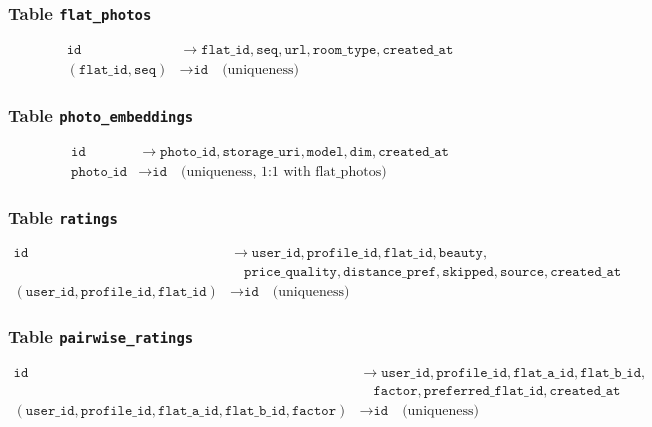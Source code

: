 \documentclass[12pt,a4paper]{article}
\begin{document}
\subsubsection{Table \texttt{flat\_photos}}
\begin{align}
    \texttt{id} &\rightarrow \texttt{flat\_id}, \texttt{seq}, \texttt{url}, \texttt{room\_type}, \texttt{created\_at} \\
    (\texttt{flat\_id}, \texttt{seq}) &\rightarrow \texttt{id} \quad \text{(uniqueness)}
\end{align}

\subsubsection{Table \texttt{photo\_embeddings}}
\begin{align}
    \texttt{id} &\rightarrow \texttt{photo\_id}, \texttt{storage\_uri}, \texttt{model}, \texttt{dim}, \texttt{created\_at} \\
    \texttt{photo\_id} &\rightarrow \texttt{id} \quad \text{(uniqueness, 1:1 with flat\_photos)}
\end{align}

\subsubsection{Table \texttt{ratings}}
\begin{align}
    \texttt{id} &\rightarrow \texttt{user\_id}, \texttt{profile\_id}, \texttt{flat\_id}, \texttt{beauty}, \\
    &\quad \texttt{price\_quality}, \texttt{distance\_pref}, \texttt{skipped}, \texttt{source}, \texttt{created\_at} \\
    (\texttt{user\_id}, \texttt{profile\_id}, \texttt{flat\_id}) &\rightarrow \texttt{id} \quad \text{(uniqueness)}
\end{align}

\subsubsection{Table \texttt{pairwise\_ratings}}
\begin{align}
    \texttt{id} &\rightarrow \texttt{user\_id}, \texttt{profile\_id}, \texttt{flat\_a\_id}, \texttt{flat\_b\_id}, \\
    &\quad \texttt{factor}, \texttt{preferred\_flat\_id}, \texttt{created\_at} \\
    (\texttt{user\_id}, \texttt{profile\_id}, \texttt{flat\_a\_id}, \texttt{flat\_b\_id}, \texttt{factor}) &\rightarrow \texttt{id} \quad \text{(uniqueness)}
\end{align}
\end{document}

